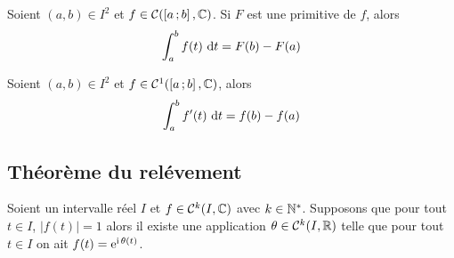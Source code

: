 \begin{prop}
  Soient \((a,b) \in I^2\) et \(f \in \mathcal{C}(\left[ a \, ;  b \right],\mathbb{C})\). Si \(F\) est une primitive de \(f\), alors
  \begin{equation}
    \int_a^b f(t)\,\mathop{}\mathopen{}\mathrm{d} t = F(b)-F(a)
  \end{equation}
\end{prop}

\begin{cor}
  Soient \((a,b) \in I^2\) et \(f \in \mathcal{C}^{1}(\left[ a \, ;  b \right],\mathbb{C})\), alors
  \begin{equation}
    \int_a^b f'(t)\,\mathop{}\mathopen{}\mathrm{d} t = f(b)-f(a)
  \end{equation}
\end{cor}

\subsection{Théorème du relévement}

\begin{theo}
  Soient un intervalle réel \(I\) et \(f \in \mathcal{C}^{k}(I,\mathbb{C})\) avec \(k \in \mathbb{N}^*\). Supposons que pour tout \(t \in I\), \(|f(t)|=1\) alors il existe une application \(\theta \in \mathcal{C}^{k}(I,\mathbb{R})\) telle que pour tout \(t \in I\) on ait \(f(t) = \operatorname{e}^{\operatorname{i}\theta(t)}\).
\end{theo}

